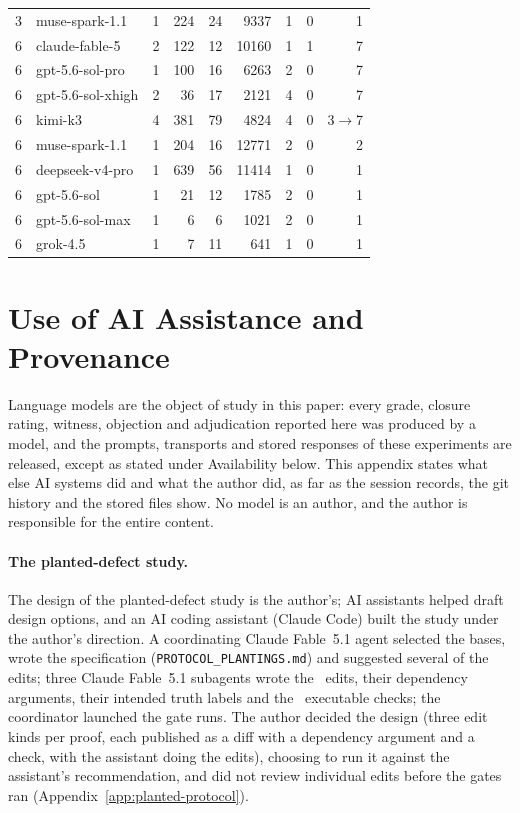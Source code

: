 \begin{table}[htbp]
\begin{tabular}{@{}llrrrrrrr@{}}
    3 & muse-spark-1.1 & 1 & 224 & 24 & 9337 & 1 & 0 & 1 \\
    6 & claude-fable-5 & 2 & 122 & 12 & 10160 & 1 & 1 & 7 \\
    6 & gpt-5.6-sol-pro & 1 & 100 & 16 & 6263 & 2 & 0 & 7 \\
    6 & gpt-5.6-sol-xhigh & 2 & 36 & 17 & 2121 & 4 & 0 & 7 \\
    6 & kimi-k3 & 4 & 381 & 79 & 4824 & 4 & 0 & 3$\to$7 \\
    6 & muse-spark-1.1 & 1 & 204 & 16 & 12771 & 2 & 0 & 2 \\
    6 & deepseek-v4-pro & 1 & 639 & 56 & 11414 & 1 & 0 & 1 \\
    6 & gpt-5.6-sol & 1 & 21 & 12 & 1785 & 2 & 0 & 1 \\
    6 & gpt-5.6-sol-max & 1 & 6 & 6 & 1021 & 2 & 0 & 1 \\
    6 & grok-4.5 & 1 & 7 & 11 & 641 & 1 & 0 & 1 \\
    \bottomrule
  \end{tabular}
\end{table}

\clearpage
\section{Use of AI Assistance and Provenance}
\label{app:aiuse}
Language models are the object of study in this paper: every grade, closure rating, witness, objection and adjudication reported here was produced by a model, and the prompts, transports and stored responses of these experiments are released, except as stated under Availability below. This appendix states what else AI systems did and what the author did, as far as the session records, the git history and the stored files show. No model is an author, and the author is responsible for the entire content.

\paragraph{The planted-defect study.} The design of the planted-defect study is the author's; AI assistants helped draft design options, and an AI coding assistant (Claude Code) built the study under the author's direction. A coordinating Claude Fable~5.1 agent selected the bases, wrote the specification (\texttt{PROTOCOL\_PLANTINGS.md}) and suggested several of the edits; three Claude Fable~5.1 subagents wrote the \CRNMutants\ edits, their dependency arguments, their intended truth labels and the \CRNChecks\ executable checks; the coordinator launched the gate runs. The author decided the design (three edit kinds per proof, each published as a diff with a dependency argument and a check, with the assistant doing the edits), choosing to run it against the assistant's recommendation, and did not review individual edits before the gates ran (Appendix~\ref{app:planted-protocol}).

